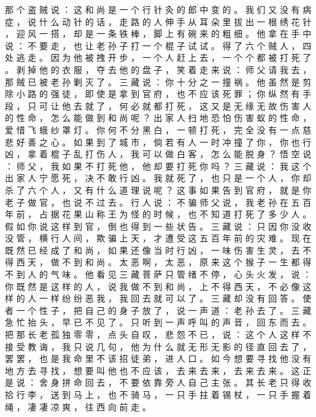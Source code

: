{那 个 盗 贼 说 ： 这 和 尚 是 一 个 行 针 灸 的 郎 中 变 的 。
我 们 又 没 有 病 症 ， 说 什 么 动 针 的 话 ， 走 路 的 人 伸 手 从 耳 朵 里 拔 出 一 根 绣 花 针 ， 迎 风 一 搭 ， 却 是 一 条 铁 棒 ， 脚 上 有 碗 来 的 粗 细 。
他 拿 在 手 中 说 ： 不 要 走 ， 也 让 老 孙 子 打 一 个 棍 子 试 试 。
得 了 六 个 贼 人 ， 四 处 逃 走 。
因 为 他 被 拽 开 步 ， 一 个 人 赶 上 去 ， 一 个 个 都 被 打 死 了 。
剥 掉 他 的 衣 服 ， 夺 去 他 的 盘 子 ， 笑 着 走 来 说 ： 师 父 请 我 去 ， 那 贼 已 被 老 孙 剿 灭 了 。
三 藏 说 ： 你 十 分 之 一 撞 祸 。
他 虽 然 是 剪 除 小 路 的 强 徒 ， 即 使 是 拿 到 官 府 ， 也 不 应 该 死 罪 ； 你 纵 然 有 手 段 ， 只 可 让 他 去 就 了 ， 何 必 就 都 打 死 ， 这 又 是 无 缘 无 故 伤 害 人 的 性 命 ， 怎 么 能 做 到 和 尚 呢 ？ 出 家 人 扫 地 恐 怕 伤 害 蚁 的 性 命 ， 爱 惜 飞 蛾 纱 罩 灯 。
你 何 不 分 黑 白 ， 一 顿 打 死 ， 完 全 没 有 一 点 慈 悲 好 善 之 心 。
如 果 到 了 城 市 ， 倘 若 有 人 一 时 冲 撞 了 你 ， 你 也 行 凶 ， 拿 着 棍 子 乱 打 伤 人 ， 我 可 以 做 白 客 ， 怎 么 能 脱 身 ？ 悟 空 说 ： 师 父 ， 我 如 果 不 打 死 他 ， 他 却 要 打 死 你 吗 ？
三 藏 说 ： 我 这 个 出 家 人 宁 愿 死 ， 决 不 敢 行 凶 。
我 就 死 了 ， 也 只 是 一 个 人 ， 你 却 杀 了 六 个 人 ， 又 有 什 么 道 理 说 呢 ？ 这 事 如 果 告 到 官 府 ， 就 是 你 老 子 做 官 ， 也 说 不 过 去 。
行 人 说 ： 不 骗 师 父 说 ， 我 老 孙 在 五 百 年 前 ， 占 据 花 果 山 称 王 为 怪 的 时 候 ， 也 不 知 道 打 死 了 多 少 人 。
假 如 你 说 这 样 到 官 ， 倒 也 得 到 一 些 状 告 。
三 藏 说 ： 只 因 你 没 收 没 管 ， 横 行 人 间 ， 欺 骗 上 天 ， 才 遭 受 这 五 百 年 前 的 灾 难 。
现 在 既 然 已 经 成 了 和 尚 ， 如 果 还 像 当 时 行 凶 ， 一 味 伤 害 生 灵 ， 去 不 得 西 天 ， 做 不 到 和 尚 。
太 恶 啊 ， 太 恶 ， 原 来 这 个 猴 子 一 生 都 得 不 到 人 的 气 味 。
他 看 见 三 藏 菩 萨 只 管 绪 不 停 ， 心 头 火 发 ， 说 ： 你 既 然 是 这 样 的 人 ， 说 我 做 不 到 和 尚 ， 上 不 得 西 天 ， 不 必 像 这 样 的 人 一 样 纷 纷 恶 我 ， 我 回 去 就 可 以 了 。
三 藏 却 没 有 回 答 。
使 者 一 个 性 子 ， 把 自 己 的 身 子 放 了 ， 说 一 声 道 ： 老 孙 去 了 。 三 藏 急 忙 抬 头 ， 早 已 不 见 了 。
只 听 到 一 声 呼 叫 的 声 音 ， 回 东 而 去 。
把 那 长 老 孤 独 零 零 ， 点 头 自 叹 ， 悲 怨 不 已 ， 说 ： 这 个 人 这 样 不 接 受 教 诲 ， 我 只 说 几 句 ， 他 为 什 么 就 无 形 无 影 的 径 直 回 去 了 ， 罢 罢 ， 也 是 我 命 里 不 该 招 徒 弟 ， 进 人 口 。
如 今 想 要 寻 找 他 没 有 地 方 去 寻 找 ， 想 要 叫 他 也 不 应 该 ， 去 来 去 来 ， 去 来 去 来 。
这 正 是 说 ： 舍 身 拼 命 回 去 ， 不 要 依 靠 旁 人 自 己 主 张 。
其 长 老 只 得 收 拾 行 李 ， 送 到 马 上 ， 也 不 骑 马 ， 一 只 手 拄 着 锡 杖 ， 一 只 手 握 着 绳 ， 凄 凄 凉 爽 ， 往 西 向 前 走 。
}
